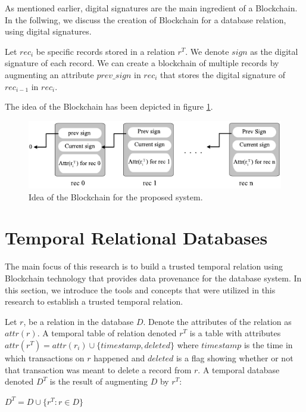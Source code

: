 		As mentioned earlier, digital signatures are the main ingredient of a Blockchain. In the follwing, we discuss the creation of Blockchain for a database relation, using digital signatures.
		\begin{defn}[Blockchain] 
			Let $rec_i$ be specific records stored in a relation $r^T$. We denote $sign$ as the digital signature of each record. We can create a blockchain of multiple records by augmenting an attribute $prev\_sign$ in $rec_i$ that stores the digital signature of $rec_{i-1}$ in $rec_i$.
		\end{defn}
		The idea of the Blockchain has been depicted in figure \ref{fig:Blockchain}.
		\begin{figure}
			\centering
			\includegraphics[width=\textwidth]{figs/blockchain.pdf}
			\caption{Idea of the Blockchain for the proposed system.}
			\label{fig:Blockchain}
		\end{figure}

	\section{Temporal Relational Databases} \label{sec:temporal database}
		 The main focus of this research is to build a trusted temporal relation using Blockchain technology that provides data provenance for the database system. In this section, we introduce the tools and concepts that were utilized in this research to establish a trusted temporal relation.
		\begin{defn}
			Let $r$, be a relation in the database $D$. Denote the attributes of the relation as $attr(r)$. A temporal table of relation denoted $r^T$ is a table with attributes $attr(r^T) = attr(r_i) \cup \{timestamp, deleted\}$ where $timestamp$ is the time in which transactions on $r$ happened and $deleted$ is a flag showing whether or not that transaction was meant to delete a record from $r$. A temporal database denoted $D^T$ is the result of augmenting $D$ by $r^T$:

			\begin{center}
				{$D^T = D \cup \{{r^T}: r \in D \}$}
			\end{center}
		\label{dfn:temporal_database}
		\end {defn}

